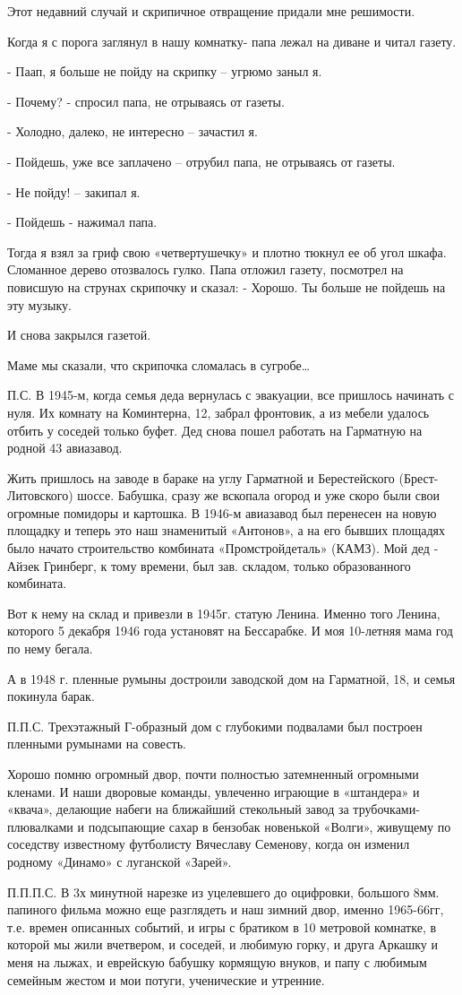 
Этот недавний случай и скрипичное отвращение придали мне решимости.

Когда я с порога заглянул в нашу комнатку- папа лежал на диване и читал газету.

- Паап, я больше не пойду на скрипку – угрюмо заныл я.

- Почему? - спросил папа, не отрываясь от газеты.

- Холодно, далеко, не интересно – зачастил я.

- Пойдешь, уже все заплачено – отрубил папа, не отрываясь от газеты.

- Не пойду! – закипал я.

- Пойдешь - нажимал папа.

Тогда я взял за гриф свою «четвертушечку» и плотно тюкнул ее об угол шкафа.
Сломанное дерево отозвалось гулко. Папа отложил газету, посмотрел на повисшую
на струнах скрипочку и сказал: - Хорошо. Ты больше не пойдешь на эту музыку. 

И снова закрылся газетой. 

Маме мы сказали, что скрипочка сломалась в сугробе…

П.С.  В 1945-м, когда семья деда вернулась с эвакуации, все пришлось начинать с
нуля. Их комнату на Коминтерна, 12, забрал фронтовик, а из мебели удалось
отбить у соседей только буфет. Дед снова пошел работать на Гарматную на родной
43 авиазавод.  

Жить пришлось на заводе в бараке на углу Гарматной и Берестейского
(Брест-Литовского) шоссе. Бабушка, сразу же вскопала огород и уже скоро были
свои огромные помидоры и картошка. В 1946-м авиазавод был перенесен на новую
площадку и теперь это наш знаменитый «Антонов», а на его бывших площадях было
начато строительство комбината «Промстройдеталь» (КАМЗ). Мой дед - Айзек
Гринберг, к тому времени, был зав. складом, только образованного комбината.

Вот к нему на склад и привезли в 1945г. статую Ленина. Именно того Ленина,
которого 5 декабря 1946 года   установят на Бессарабке. И моя 10-летняя мама
год по нему бегала. 

А в 1948 г. пленные румыны достроили заводской дом на Гарматной, 18, и семья
покинула барак. 

П.П.С. Трехэтажный Г-образный дом с глубокими подвалами был построен пленными
румынами на совесть. 

Хорошо помню огромный двор, почти полностью затемненный огромными кленами. И
наши дворовые команды, увлеченно играющие в «штандера» и «квача», делающие
набеги на ближайший стекольный завод за трубочками-плювалками и  подсыпающие
сахар в бензобак новенькой «Волги», живущему по соседству известному футболисту
Вячеславу Семенову, когда он изменил родному «Динамо» с луганской «Зарей».

П.П.П.С. В 3х минутной нарезке из уцелевшего до оцифровки, большого 8мм.
папиного фильма можно еще  разглядеть и наш зимний двор, именно 1965-66гг, т.е.
времен описанных событий, и игры с братиком в 10 метровой комнатке, в которой
мы жили вчетвером, и соседей, и любимую горку, и друга Аркашку и меня на лыжах,
и еврейскую бабушку кормящую внуков, и папу с  любимым семейным жестом и мои
потуги,  ученические и утренние.
